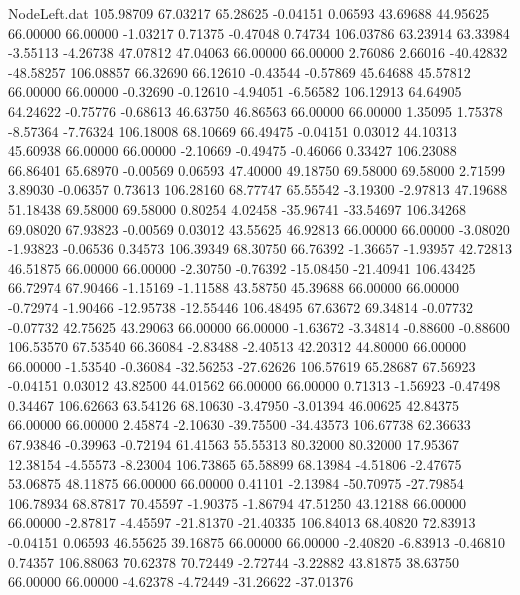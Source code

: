 \begin{filecontents}{NodeLeft.dat}
 105.98709   67.03217   65.28625    -0.04151    0.06593   43.69688   44.95625   66.00000   66.00000   -1.03217    0.71375   -0.47048    0.74734
 106.03786   63.23914   63.33984    -3.55113   -4.26738   47.07812   47.04063   66.00000   66.00000    2.76086    2.66016  -40.42832  -48.58257
 106.08857   66.32690   66.12610    -0.43544   -0.57869   45.64688   45.57812   66.00000   66.00000   -0.32690   -0.12610   -4.94051   -6.56582
 106.12913   64.64905   64.24622    -0.75776   -0.68613   46.63750   46.86563   66.00000   66.00000    1.35095    1.75378   -8.57364   -7.76324
 106.18008   68.10669   66.49475    -0.04151    0.03012   44.10313   45.60938   66.00000   66.00000   -2.10669   -0.49475   -0.46066    0.33427
 106.23088   66.86401   65.68970    -0.00569    0.06593   47.40000   49.18750   69.58000   69.58000    2.71599    3.89030   -0.06357    0.73613
 106.28160   68.77747   65.55542    -3.19300   -2.97813   47.19688   51.18438   69.58000   69.58000    0.80254    4.02458  -35.96741  -33.54697
 106.34268   69.08020   67.93823    -0.00569    0.03012   43.55625   46.92813   66.00000   66.00000   -3.08020   -1.93823   -0.06536    0.34573
 106.39349   68.30750   66.76392    -1.36657   -1.93957   42.72813   46.51875   66.00000   66.00000   -2.30750   -0.76392  -15.08450  -21.40941
 106.43425   66.72974   67.90466    -1.15169   -1.11588   43.58750   45.39688   66.00000   66.00000   -0.72974   -1.90466  -12.95738  -12.55446
 106.48495   67.63672   69.34814    -0.07732   -0.07732   42.75625   43.29063   66.00000   66.00000   -1.63672   -3.34814   -0.88600   -0.88600
 106.53570   67.53540   66.36084    -2.83488   -2.40513   42.20312   44.80000   66.00000   66.00000   -1.53540   -0.36084  -32.56253  -27.62626
 106.57619   65.28687   67.56923    -0.04151    0.03012   43.82500   44.01562   66.00000   66.00000    0.71313   -1.56923   -0.47498    0.34467
 106.62663   63.54126   68.10630    -3.47950   -3.01394   46.00625   42.84375   66.00000   66.00000    2.45874   -2.10630  -39.75500  -34.43573
 106.67738   62.36633   67.93846    -0.39963   -0.72194   61.41563   55.55313   80.32000   80.32000   17.95367   12.38154   -4.55573   -8.23004
 106.73865   65.58899   68.13984    -4.51806   -2.47675   53.06875   48.11875   66.00000   66.00000    0.41101   -2.13984  -50.70975  -27.79854
 106.78934   68.87817   70.45597    -1.90375   -1.86794   47.51250   43.12188   66.00000   66.00000   -2.87817   -4.45597  -21.81370  -21.40335
 106.84013   68.40820   72.83913    -0.04151    0.06593   46.55625   39.16875   66.00000   66.00000   -2.40820   -6.83913   -0.46810    0.74357
 106.88063   70.62378   70.72449    -2.72744   -3.22882   43.81875   38.63750   66.00000   66.00000   -4.62378   -4.72449  -31.26622  -37.01376

\end{filecontents}
